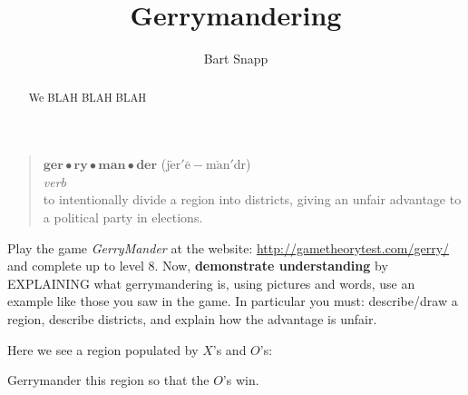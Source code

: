 \documentclass[noauthor,nooutcomes,hints,handout]{ximera}
\title{Gerrymandering}
\author{Bart Snapp}
\begin{document}
\begin{abstract}
  We BLAH BLAH BLAH 
\end{abstract}
\maketitle

\begin{listOutcomes}
\item
\end{listOutcomes}
\begin{mdframed}[style=OutcomeStyle]
\begin{quote}
  $\textbf{ger}\bullet\textbf{ry}\bullet\textbf{man}\bullet\textbf{der}$ (j$\check{\text{e}}$r$'\bar{\text{e}}-$m$\check{\text{a}}$n$'$d{}r)
  \\
  
  \textit{verb}\\

  
\quad to intentionally divide a region into districts, giving an
unfair advantage to a political party in elections.
\end{quote}
\end{mdframed}




\mynewpage






\begin{question}
  Play the game \textsl{GerryMander} at the website:
  \url{http://gametheorytest.com/gerry/} and complete up to level 8.
  Now, \textbf{demonstrate understanding} by EXPLAINING what
  gerrymandering is, using pictures and words, use an example like
  those you saw in the game. In particular you must: describe/draw a
  region, describe districts, and explain how the advantage is unfair.
  
\end{question}

\mynewpage

\begin{question}
  Here we see a region populated by $X$'s and $O$'s:

  Gerrymander this region so that the $O$'s win.
\end{question}

\mynewpage

\begin{question}%
\end{question}%



\end{document}
